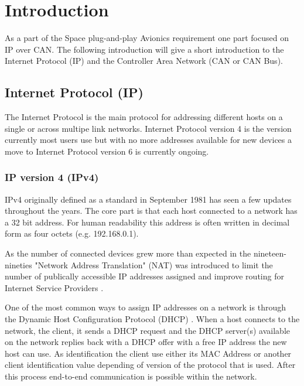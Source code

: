 \section{Introduction}\label{sec:introduction}
As a part of the Space plug-and-play Avionics requirement one part
focused on IP over CAN. The following introduction will give a short
introduction to the Internet Protocol (IP) and the Controller Area Network
(CAN or CAN Bus).

\subsection{Internet Protocol (IP)}
The Internet Protocol is the main protocol for addressing different hosts on a
single or across multipe link networks. Internet Protocol version 4 is the
version currently most users use but with no more addresses available
for new devices a move to Internet Protocol version 6 is currently ongoing.

\subsubsection{IP version 4 (IPv4)}\label{introduction:ipv4}
IPv4 originally defined as a standard in September 1981 \cite{web:rfc791} has
seen a few updates throughout the years. The core part is that each host
connected to a network has a 32 bit address. For human readability this address
is often written in decimal form as four octets (e.g. 192.168.0.1).

As the number of connected devices grew more than expected in the nineteen-nineties
"Network Address Translation" (NAT) was introduced to limit the number of
publically accessible IP addresses assigned and improve routing for Internet
Service Providers \cite{web:rfc1631, web:rfc1918, web:rfc3022}.

One of the most common ways to assign IP addresses on a network is through the
Dynamic Host Configuration Protocol (DHCP) \cite{web:rfc2131, web:rfc2132, web:rfc4361}.
When a host connects to the network, the client, it sends a DHCP request and the DHCP
server(s) available on the network replies back with a DHCP offer with a free
IP address the new host can use. As identification the client use either its
MAC Address or another client identification value depending of version of the
protocol that is used. After this process end-to-end communication is possible
within the network.

